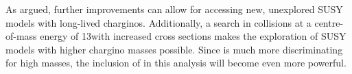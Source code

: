 As argued, further improvements can allow for accessing new, unexplored SUSY models with long-lived charginos.
Additionally, a search in collisions at a centre-of-mass energy of 13\tev with increased cross sections makes the exploration of SUSY models with higher chargino masses possible.
Since \dedx is much more discriminating for high masses, the inclusion of \dedx in this analysis will become even more powerful. 






